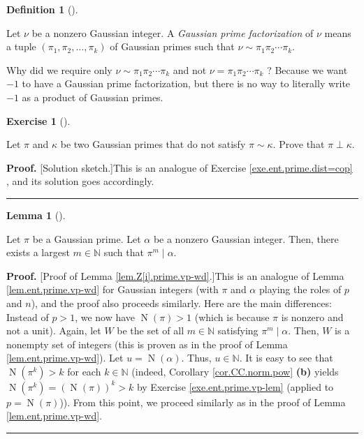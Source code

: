 \documentclass[numbers=enddot,12pt,final,onecolumn,notitlepage]{scrartcl}%
\newcounter{exer}
\numberwithin{exer}{subsection}
\theoremstyle{definition}
\newtheorem{lem}[theo]{Lemma}
\newenvironment{lemma}[1][]
{\begin{lem}[#1]\begin{leftbar}}
{\end{leftbar}\end{lem}}
\newtheorem{defi}[theo]{Definition}
\newenvironment{definition}[1][]
{\begin{defi}[#1]\begin{leftbar}}
{\end{leftbar}\end{defi}}
\newtheorem{exmp}[exer]{Exercise}
\newenvironment{exercise}[1][]
{\begin{exmp}[#1]\begin{leftbar}}
{\end{leftbar}\end{exmp}}
\newenvironment{proof}[1][Proof]{\noindent\textbf{#1.} }{\ \rule{0.5em}{0.5em}}
\begin{document}
\begin{definition}
Let $\nu$ be a nonzero Gaussian integer. A \textit{Gaussian prime
factorization} of $\nu$ means a tuple $\left(  \pi_{1},\pi_{2},\ldots,\pi
_{k}\right)  $ of Gaussian primes such that $\nu\sim\pi_{1}\pi_{2}\cdots
\pi_{k}$.
\end{definition}

Why did we require only $\nu\sim\pi_{1}\pi_{2}\cdots\pi_{k}$ and not $\nu
=\pi_{1}\pi_{2}\cdots\pi_{k}$ ? Because we want $-1$ to have a Gaussian prime
factorization, but there is no way to literally write $-1$ as a product of
Gaussian primes.

\begin{exercise}
\label{exe.Z[i].prime.dist=cop}Let $\pi$ and $\kappa$ be two Gaussian primes
that do not satisfy $\pi\sim\kappa$. Prove that $\pi\perp\kappa$.
\end{exercise}

\begin{proof}
[Solution sketch.]This is an analogue of Exercise \ref{exe.ent.prime.dist=cop}%
, and its solution goes accordingly.
\end{proof}

\begin{lemma}
\label{lem.Z[i].prime.vp-wd}Let $\pi$ be a Gaussian prime. Let $\alpha$ be a
nonzero Gaussian integer. Then, there exists a largest $m\in\mathbb{N}$ such
that $\pi^{m}\mid\alpha$.
\end{lemma}

\begin{proof}
[Proof of Lemma \ref{lem.Z[i].prime.vp-wd}.]This is an analogue of Lemma
\ref{lem.ent.prime.vp-wd} for Gaussian integers (with $\pi$ and $\alpha$
playing the roles of $p$ and $n$), and the proof also proceeds similarly. Here
are the main differences: Instead of $p>1$, we now have $\operatorname*{N}%
\left(  \pi\right)  >1$ (which is because $\pi$ is nonzero and not a unit).
Again, let $W$ be the set of all $m\in\mathbb{N}$ satisfying $\pi^{m}%
\mid\alpha$. Then, $W$ is a nonempty set of integers (this is proven as in the
proof of Lemma \ref{lem.ent.prime.vp-wd}). Let $u=\operatorname*{N}\left(
\alpha\right)  $. Thus, $u\in\mathbb{N}$. It is easy to see that
$\operatorname*{N}\left(  \pi^{k}\right)  >k$ for each $k\in\mathbb{N}$
(indeed, Corollary \ref{cor.CC.norm.pow} \textbf{(b)} yields
$\operatorname*{N}\left(  \pi^{k}\right)  =\left(  \operatorname*{N}\left(
\pi\right)  \right)  ^{k}>k$ by Exercise \ref{exe.ent.prime.vp-lem} (applied
to $p=\operatorname*{N}\left(  \pi\right)  $)). From this point, we proceed
similarly as in the proof of Lemma \ref{lem.ent.prime.vp-wd}.
\end{proof}
\end{document}
